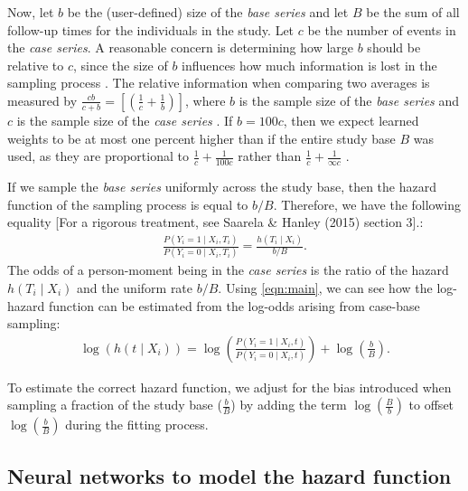 \documentclass[preprint,12pt]{elsarticle}
\begin{document}
Now, let \(b\) be the (user-defined) size of the \emph{base series} and let \(B\) be the sum of all follow-up
times for the individuals in the study. Let $c$ be the number of events in the \emph{case series}. A
reasonable concern is determining how large $b$ should be relative to $c$, since the size of \(b\)
influences how much information is lost in the sampling process \citep{hanley2009}. The relative information when comparing two averages
is measured by $\frac{cb}{c+b}=\left[\left( \frac{1}{c}+\frac{1}{b}\right)\right]$, where $b$ is the sample size of the \emph{base series} and $c$
is the sample size of the \emph{case series} \citep{hanley2009} \citep{mantel1}. If $b=100c$, then we expect learned weights to be at most one
percent higher than if the entire study base $B$ was used, as they are proportional to
$\frac{1}{c}+\frac{1}{100c}$ rather than $\frac{1}{c}+\frac{1}{\infty c}$ \citep{hanley2009} \citep{mantel1}.

If we sample the \emph{base series} uniformly across the study base, then the hazard function
of the sampling process is equal to \(b/B\). Therefore, we have the following equality \citep{saarela2015}
[For a rigorous treatment, see Saarela \& Hanley (2015) section 3].:
\begin{align}\label{eqn:main}
\frac{P\left(Y_i=1 \mid X_i, T_i\right)}{P\left(Y_i = 0 \mid X_i, T_i\right)} = \frac{h\left(T_i \mid X_i\right)}{b/B}.
\end{align} The odds of a person-moment being in the \emph{case
series} is the ratio of the hazard \(h(T_i \mid X_i)\) and the uniform
rate \(b/B\). Using \eqref{eqn:main}, we can see how the log-hazard
function can be estimated from the log-odds arising from case-base
sampling: \begin{align}\label{eqn:offset}
\log \left( h\left(t \mid X_i\right)\right) = \log \left(\frac{P\left(Y_i = 1 \mid X_i, t\right)}{P\left(Y_i = 0 \mid X_i, t\right)}\right) + \log\left(\frac{b}{B}\right).
\end{align}

To estimate the correct hazard function, we adjust for the bias introduced when sampling a fraction of the
study base (\(\frac{b}{B}\)) by adding the term \(\log\left(\frac{B}{b} \right)\) to offset \(\log\left(\frac{b}{B} \right)\)
during the fitting process.

\hypertarget{neural-networks-to-model-the-hazard-function}{%
\subsection{Neural networks to model the hazard
function}\label{neural-networks-to-model-the-hazard-function}}
\end{document}
